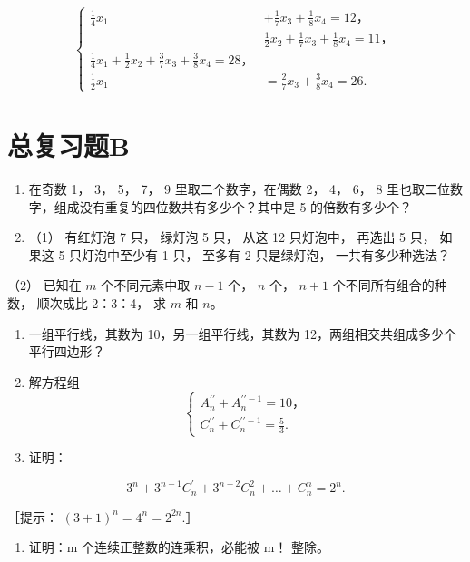 \[
\left\{ \begin{array}{ll} \frac {1}{4} x _ {1} & + \frac {1}{7} x _ {3} + \frac {1}{8} x _ {4} = 12\text{，} \\ & \frac {1}{2} x _ {2} + \frac {1}{7} x _ {3} + \frac {1}{8} x _ {4} = 11\text{，} \\ \frac {1}{4} x _ {1} + \frac {1}{2} x _ {2} + \frac {3}{7} x _ {3} + \frac {3}{8} x _ {4} = 28\text{，} \\ \frac {1}{2} x _ {1} & = \frac {2}{7} x _ {3} + \frac {3}{8} x _ {4} = 26. \end{array} \right. \tag {2}
\]

\section{总复习题B}

\begin{enumerate}
\item
  在奇数 1， 3， 5， 7， 9 里取二个数字，在偶数 2， 4， 6， 8
  里也取二位数字，组成没有重复的四位数共有多少个？其中是 5
  的倍数有多少个？
\item
  （1） 有红灯泡 7 只， 绿灯泡 5 只， 从这 12 只灯泡中， 再选出 5 只，
  如果这 5 只灯泡中至少有 1 只， 至多有 2 只是绿灯泡，
  一共有多少种选法？
\end{enumerate}

（2） 已知在 \(m\) 个不同元素中取 \(n - 1\) 个， \(n\) 个， \(n + 1\)
个不同所有组合的种数， 顺次成比 2：3：4， 求 \(m\) 和 \(n\)。

\begin{enumerate}[start=3]
\item
  一组平行线，其数为 10，另一组平行线，其数为
  12，两组相交共组成多少个平行四边形？
\item
  解方程组
\[
\left\{ \begin{array}{l} A _ {n} ^ {\prime \prime} + A _ {n} ^ {\prime \prime - 1} = 10\text{，} \\ C _ {n} ^ {\prime \prime} + C _ {n} ^ {\prime \prime - 1} = \frac {5}{3}. \end{array} \right.
\]
\item
  证明：
\end{enumerate}

\[
3 ^ {n} + 3 ^ {n - 1} C _ {n} ^ {\prime} + 3 ^ {n - 2} C _ {n} ^ {2} + \dots + C _ {n} ^ {n} = 2 ^ {n}.
\]

［提示： \((3+1)^{n}=4^{n}=2^{2n}.\)］

\begin{enumerate}[start=6]
\item
  证明：m 个连续正整数的连乘积，必能被 m！ 整除。
\end{enumerate}

